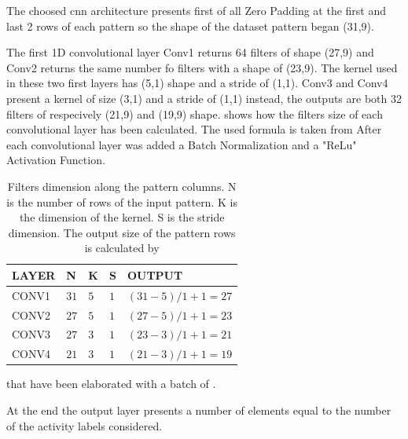 The choosed \gls{cnn} architecture presents first of all Zero Padding at the first and last 2 rows of each pattern so the shape of the dataset pattern began (31,9). 

The first 1D convolutional layer Conv1 returns 64 filters of shape (27,9) and Conv2 returns the same number fo filters with a shape of (23,9). The kernel used in these two first layers has (5,1) shape and a stride of (1,1). 
Conv3 and Conv4 present a kernel of size (3,1) and a stride of (1,1) instead, the outputs are both 32 filters of respecively (21,9) and (19,9) shape.
 shows how the filters size of each convolutional layer has been calculated. The used formula is taken from 
After each convolutional layer was added a Batch Normalization and a "ReLu" Activation Function.



\begin{table}[htp]
\small
	\centering
		\renewcommand{\arraystretch}{1}%
	\begin{tabular}{@{}lllll@{}}
	\toprule
	LAYER & N & K & S & OUTPUT\\
	\midrule
	CONV1 & $31$ & $5$ & $1$ & $(31-5)/1+1 = 27$\\
	CONV2 & $27$ & $5$ & $1$ & $(27-5)/1+1 = 23$\\
	CONV3 & $27$ & $3$ & $1$ & $(23-3)/1+1 = 21$\\
	CONV4 & $21$ & $3$ & $1$ & $(21-3)/1+1 = 19$\\ 
	\bottomrule
	\end{tabular}
	\caption{Filters dimension along the pattern columns. N is the number of rows of the input pattern. K is the dimension of the kernel. S is the stride dimension. The output size of the pattern rows is calculated by }
	\label{tab:filtersize}
\end{table}


 that have been elaborated with a batch of . 



At the end the output layer presents a number of elements equal to the number of the activity labels considered.




